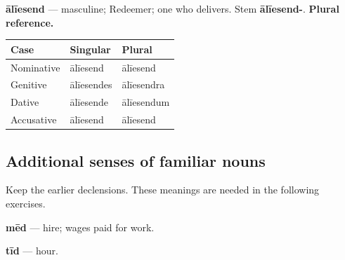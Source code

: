\textbf{ālīesend} — masculine; Redeemer; one who delivers. Stem \textbf{ālīesend-}. \textbf{Plural reference.}

\par\begingroup
\fontsize{10.5}{13.2}\selectfont
\setlength{\LTleft}{0pt}\setlength{\LTright}{\fill}
\noindent
\begin{tabular}{@{}>{\raggedright\arraybackslash}p{39.46mm}>{\raggedright\arraybackslash}p{39.46mm}>{\raggedright\arraybackslash}p{39.46mm}@{}}
\toprule
\textbf{Case} & \textbf{Singular} & \textbf{Plural} \\
\midrule
Nominative & ālīesend & ālīesend \\
Genitive & ālīesendes & ālīesendra \\
Dative & ālīesende & ālīesendum \\
Accusative & ālīesend & ālīesend \\
\bottomrule
\end{tabular}
\par\endgroup

\subsection*{Additional senses of familiar nouns}

Keep the earlier declensions. These meanings are needed in the following exercises.

\textbf{mēd} — hire; wages paid for work.

\textbf{tīd} — hour.

